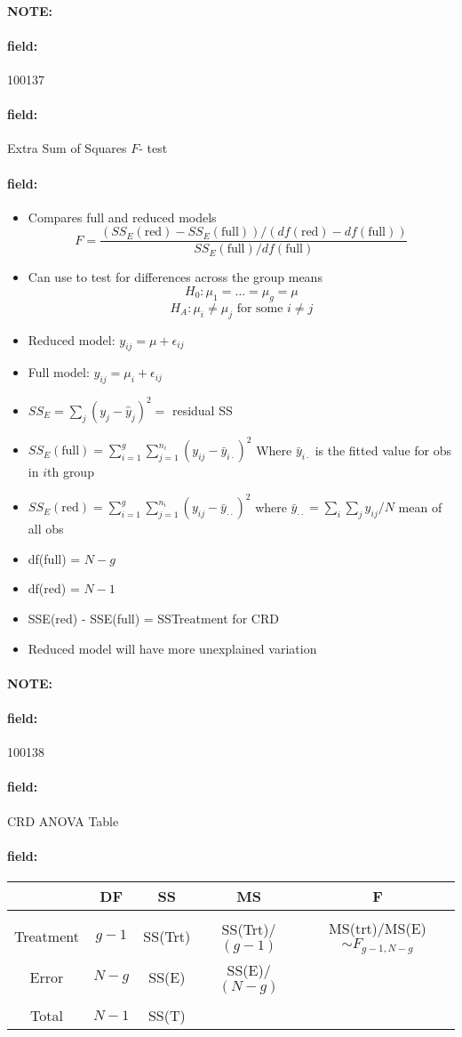 \documentclass[12pt]{article}
\newenvironment{note}{\paragraph{NOTE:}}{}
\newenvironment{field}{\paragraph{field:}}{}
\begin{document}
\begin{note}
    \begin{field}
        \tiny 100137
    \end{field}
    \begin{field}
        Extra Sum of Squares $F$- test
    \end{field}
    \begin{field}
        \begin{itemize}
          \item Compares full and reduced models
          $$ F = \frac{(SS_E(\text{red}) - SS_E(\text{full}))/(df(\text{red}) - df(\text{full}))}{SS_E(\text{full})/df(\text{full})}$$
          \item Can use to test for differences across the group means
          $$ H_0: \mu_1 = \ldots = \mu_g = \mu$$
          $$H_A: \mu_i \neq \mu_j  \text{ for some } i \neq j$$
          \item Reduced model: $y_{ij} = \mu + \epsilon_{ij}$
          \item Full model: $y_{ij} = \mu_i + \epsilon_{ij}$
          \item $SS_E = \sum_{j}(y_j - \hat{y}_j)^2 = $ residual SS
          \item $SS_E(\text{full}) = \sum_{i = 1}^g \sum_{j = 1}^{n_i}(y_{ij} - \bar{y}_{i\cdot})^2$ Where $\bar{y}_{i\cdot}$ is the fitted value for obs in $i$th group
          \item $SS_E(\text{red}) = \sum_{i=1}^g \sum_{j=1}^{n_i}(y_{ij} - \bar{y}_{\cdot \cdot})^2$ where $\bar{y}_{\cdot\cdot} = \sum_{i}\sum_j y_{ij}/N$ mean of all obs
          \item df(full) = $N-g$
          \item df(red) = $N-1$
          \item SSE(red) - SSE(full) = SSTreatment for CRD
          \item Reduced model will have more unexplained variation
        \end{itemize}
    \end{field}
\end{note}

\begin{note}
    \begin{field}
        \tiny 100138
    \end{field}
    \begin{field}
        CRD ANOVA Table
    \end{field}
    \begin{field}
        \begin{tabular}{c|c c c c}
          & DF & SS & MS & F \\
          \hline \\
          Treatment & $g-1$ & SS(Trt) & SS(Trt)/$(g-1)$ & MS(trt)/MS(E) $\sim F_{g-1,N-g}$\\
          Error & $N-g$ & SS(E) & SS(E)/$(N-g)$ & \\
          \hline \\
          Total & $N-1$ & SS(T) & &
        \end{tabular}
    \end{field}
\end{note}
\end{document}
